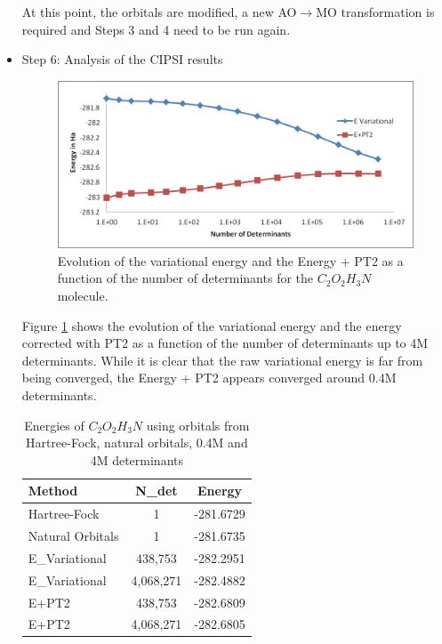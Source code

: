 \begin{itemize}
At this point, the orbitals are modified, a new AO$\rightarrow$MO transformation is required and Steps 3 and 4 need to be run again.\\

\item Step 6: Analysis of the CIPSI results\\
\begin{figure}
\begin{center}
\includegraphics[trim = 2mm 2mm 2mm 2mm, clip,width=0.95\columnwidth]{figures/CIPSI.jpg}
\end{center}
\caption{Evolution of the variational energy and the Energy + PT2 as a function of the number of determinants for the $C_2O_2H_3N$ molecule. 
\label{fig:CIPSI}
}
\end{figure}
Figure \ref{fig:CIPSI} shows the evolution of the variational energy and the energy corrected with PT2 as a function of the number of determinants up to 4M determinants. While it is clear that the raw variational energy is far from being converged, the Energy + PT2 appears converged around 0.4M determinants.\\



\begin{table}[t]
\centering
\caption{Energies of $C_2O_2H_3N$ using orbitals from Hartree-Fock, natural orbitals, 0.4M and 4M determinants}
\label{TAB:CIPSI}
\begin{tabular}{l|c|c}
\hline \hline
Method & N\_det & Energy\\
\hline
Hartree-Fock &    1    & -281.6729\\
Natural Orbitals & 1 & -281.6735\\
E\_Variational &  438,753 & -282.2951 \\
E\_Variational &  4,068,271   & -282.4882 \\
E+PT2 & 438,753& -282.6809 \\
E+PT2 & 4,068,271 & -282.6805  \\ \hline \hline
\end{tabular}
\end{table}



\end{itemize}
